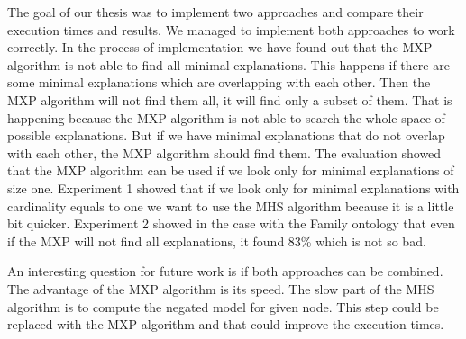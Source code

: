\documentclass[12pt,a4paper]{article}
\begin{document}
The goal of our thesis was to implement two approaches and compare their execution times and results. We managed to implement both approaches to work correctly. In the process of implementation we have found out that the MXP algorithm is not able to find all minimal explanations. This happens if there are some minimal explanations which are overlapping with each other. Then the MXP algorithm will not find them all, it will find only a subset of them. That is happening because the MXP algorithm is not able to search the whole space of possible explanations. But if we have minimal explanations that do not overlap with each other, the MXP algorithm should find them. The evaluation showed that the MXP algorithm can be used if we look only for minimal explanations of size one. Experiment 1 showed that if we look only for minimal explanations with cardinality equals to one we want to use the MHS algorithm because it is a little bit quicker. Experiment 2 showed in the case with the Family ontology that even if the MXP will not find all explanations, it found 83\% which is not so bad. 

An interesting question for future work is if both approaches can be combined. The advantage of the MXP algorithm is its speed. The slow part of the MHS algorithm is to compute the negated model for given node. This step could be replaced with the MXP algorithm and that could improve the execution times.

\pagebreak


\end{document}
